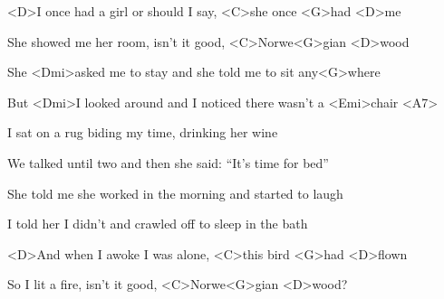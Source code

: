 
\zs
<D>I once had a girl or should I say, <C>she once <G>had <D>me

She showed me her room, isn't it good, <C>Norwe<G>gian <D>wood

She <Dmi>asked me to stay and she told me to sit any<G>where

But <Dmi>I looked around and I noticed there wasn't a <Emi>chair <A7>
\ks

\zs
I sat on a rug biding my time, drinking her wine

We talked until two and then she said: ``It's time for bed''

She told me she worked in the morning and started to laugh

I told her I didn't and crawled off to sleep in the bath
\ks

\zr
<D>And when I awoke I was alone, <C>this bird <G>had <D>flown

So I lit a fire, isn't it good, <C>Norwe<G>gian <D>wood?
\kr

\kp





